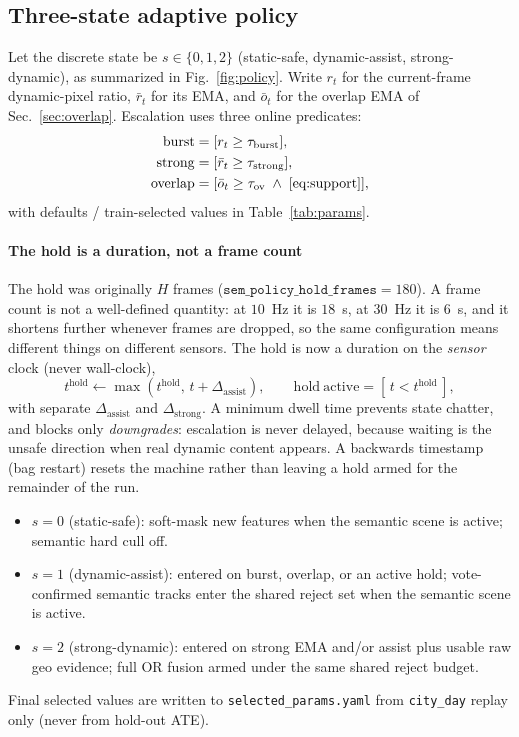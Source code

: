 \documentclass{ieeeaccess}
\begin{document}
\subsection{Three-state adaptive policy}
\label{sec:policy}
Let the discrete state be \(s\in\{0,1,2\}\) (static-safe, dynamic-assist, strong-dynamic), as summarized in Fig.~\ref{fig:policy}.
Write \(r_t\) for the current-frame dynamic-pixel ratio, \(\bar{r}_t\) for its EMA, and \(\bar{o}_t\) for the overlap EMA of Sec.~\ref{sec:overlap}.
Escalation uses three online predicates:
\begin{align}
\mathrm{burst} &= [r_t \ge \tau_{\mathrm{burst}}], \\
\mathrm{strong} &= [\bar{r}_t \ge \tau_{\mathrm{strong}}], \\
\mathrm{overlap} &= [\bar{o}_t \ge \tau_{\mathrm{ov}} \;\wedge\; \eqref{eq:support}],
\end{align}
with defaults / train-selected values in Table~\ref{tab:params}.

\paragraph{The hold is a duration, not a frame count}
The hold was originally \(H\) frames (\(\texttt{sem\_policy\_hold\_frames}{=}180\)). A frame count is not a well-defined quantity: at \(10\)~Hz it is \(18\)~s, at \(30\)~Hz it is \(6\)~s, and it shortens further whenever frames are dropped, so the same configuration means different things on different sensors. The hold is now a duration on the \emph{sensor} clock (never wall-clock),
\begin{equation}
\label{eq:hold}
t^{\mathrm{hold}} \leftarrow \max\!\left(t^{\mathrm{hold}},\, t + \Delta_{\mathrm{assist}}\right),\qquad
\mathrm{hold\ active} = \left[\,t < t^{\mathrm{hold}}\,\right],
\end{equation}
with separate \(\Delta_{\mathrm{assist}}\) and \(\Delta_{\mathrm{strong}}\). A minimum dwell time prevents state chatter, and blocks only \emph{downgrades}: escalation is never delayed, because waiting is the unsafe direction when real dynamic content appears. A backwards timestamp (bag restart) resets the machine rather than leaving a hold armed for the remainder of the run.

\begin{itemize}
\item \(s{=}0\) (static-safe): soft-mask new features when the semantic scene is active; semantic hard cull off.
\item \(s{=}1\) (dynamic-assist): entered on burst, overlap, or an active hold; vote-confirmed semantic tracks enter the shared reject set when the semantic scene is active.
\item \(s{=}2\) (strong-dynamic): entered on strong EMA and/or assist plus usable raw geo evidence; full OR fusion armed under the same shared reject budget.
\end{itemize}
Final selected values are written to \texttt{selected\_params.yaml} from \texttt{city\_day} replay only (never from hold-out ATE).
\end{document}
